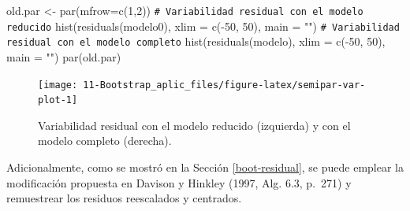 \documentclass[
  10pt,
]{book}
\newenvironment{Shaded}{\begin{snugshade}}{\end{snugshade}}
\newcommand{\AttributeTok}[1]{\textcolor[rgb]{0.77,0.63,0.00}{#1}}
\newcommand{\CommentTok}[1]{\textcolor[rgb]{0.56,0.35,0.01}{\textit{#1}}}
\newcommand{\DecValTok}[1]{\textcolor[rgb]{0.00,0.00,0.81}{#1}}
\newcommand{\FunctionTok}[1]{\textcolor[rgb]{0.00,0.00,0.00}{#1}}
\newcommand{\NormalTok}[1]{#1}
\newcommand{\OtherTok}[1]{\textcolor[rgb]{0.56,0.35,0.01}{#1}}
\newcommand{\SpecialCharTok}[1]{\textcolor[rgb]{0.00,0.00,0.00}{#1}}
\newcommand{\StringTok}[1]{\textcolor[rgb]{0.31,0.60,0.02}{#1}}
\theoremstyle{break}
\theoremstyle{nonumberplain}
\renewcommand{\CommentTok}[1]{\textcolor[rgb]{0.41,0.41,0.41}{\texttt{#1}}}
\begin{document}
\begin{Shaded}
\begin{Highlighting}[]
\NormalTok{old.par }\OtherTok{\textless{}{-}} \FunctionTok{par}\NormalTok{(}\AttributeTok{mfrow=}\FunctionTok{c}\NormalTok{(}\DecValTok{1}\NormalTok{,}\DecValTok{2}\NormalTok{))}
\CommentTok{\# Variabilidad residual con el modelo reducido}
\FunctionTok{hist}\NormalTok{(}\FunctionTok{residuals}\NormalTok{(modelo0), }\AttributeTok{xlim =} \FunctionTok{c}\NormalTok{(}\SpecialCharTok{{-}}\DecValTok{50}\NormalTok{, }\DecValTok{50}\NormalTok{), }\AttributeTok{main =} \StringTok{""}\NormalTok{)}
\CommentTok{\# Variabilidad residual con el modelo completo}
\FunctionTok{hist}\NormalTok{(}\FunctionTok{residuals}\NormalTok{(modelo), }\AttributeTok{xlim =} \FunctionTok{c}\NormalTok{(}\SpecialCharTok{{-}}\DecValTok{50}\NormalTok{, }\DecValTok{50}\NormalTok{), }\AttributeTok{main =} \StringTok{""}\NormalTok{)}
\FunctionTok{par}\NormalTok{(old.par)}
\end{Highlighting}
\end{Shaded}

\begin{figure}[!htbp]

{\centering \texttt{[image: 11-Bootstrap\_aplic\_files/figure-latex/semipar-var-plot-1]} 

}

\caption{Variabilidad residual con el modelo reducido (izquierda) y con el modelo completo (derecha).}\label{fig:semipar-var-plot}
\end{figure}

Adicionalmente, como se mostró en la Sección \ref{boot-residual}, se puede emplear
la modificación propuesta en Davison y Hinkley (1997, Alg. 6.3, p.~271)
y remuestrear los residuos reescalados y centrados.
\end{document}

